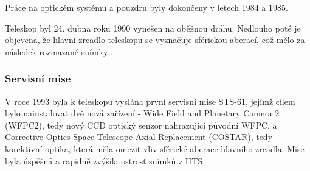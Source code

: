 \documentclass[a4paper,11pt]{article}
\begin{document}
Práce na optickém systému a pouzdru byly dokončeny v letech 1984 a 1985.


Teleskop byl 24. dubna roku 1990 vynešen na oběžnou dráhu. Nedlouho poté je objevena, že hlavní zrcadlo teleskopu se vyznačuje sférickou aberací, což mělo za následek rozmazané snímky \cite{nasaHubbleChronology}.


\subsubsection{Servisní mise}
V roce 1993 byla k teleskopu vyslána první servisní mise STS-61, jejímž cílem bylo nainstalovat dvě nová zařízení - Wide Field and Planetary Camera 2 (WFPC2), tedy nový CCD optický senzor nahrazující původní WFPC, a Corrective Optics Space Telescope Axial Replacement (COSTAR), tedy korektivní optika, která měla omezit vliv sférické aberace hlavního zrcadla. Mise byla úspěšná a rapidně zvýšila ostrost snímků z HTS.
\end{document}

